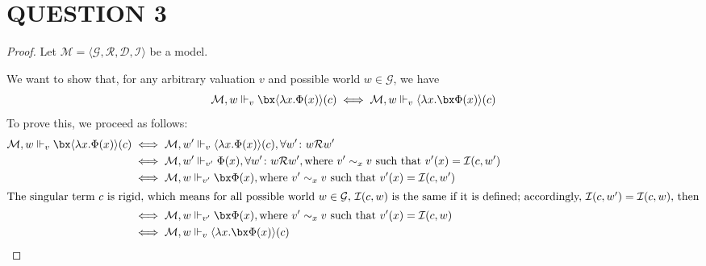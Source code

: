\section*{QUESTION 3}
\begin{proof}
Let $\mathcal{M} = \langle \mathcal{G}, \mathcal{R}, \mathcal{D}, \mathcal{I} \rangle$ be a model.

We want to show that, for any arbitrary valuation $v$ and possible world $w \in \mathcal{G}$, we have
\[
\mathcal{M}, w \Vdash_{v} \bx \langle \lambda x. \Phi(x) \rangle(c) \iff \mathcal{M}, w \Vdash_{v} \langle \lambda x. \bx \Phi(x) \rangle(c)
\]
To prove this, we proceed as follows:
\begin{align*}
\mathcal{M}, w \Vdash_{v} \bx \langle \lambda x. \Phi(x) \rangle(c)
&\iff \mathcal{M}, w' \Vdash_{v} \langle \lambda x. \Phi(x) \rangle(c), \forall w' \colon w\mathcal{R}w' \\
&\iff \mathcal{M}, w' \Vdash_{v'} \Phi(x), \forall w' \colon w\mathcal{R}w', \text{where $v' \sim_x v$ such that $v'(x) = \mathcal{I}(c, w')$} \\
&\iff \mathcal{M}, w \Vdash_{v'} \bx \Phi(x), \text{where $v' \sim_x v$ such that $v'(x) = \mathcal{I}(c, w')$} \\
\intertext{The singular term $c$ is rigid, which means for all possible world $w \in \mathcal{G}$, $\mathcal{I}(c, w)$ is the same if it is defined; accordingly, $\mathcal{I}(c, w') = \mathcal{I}(c, w)$, then}
&\iff \mathcal{M}, w \Vdash_{v'} \bx \Phi(x), \text{where $v' \sim_x v$ such that $v'(x) = \mathcal{I}(c, w)$} \\
&\iff \mathcal{M}, w \Vdash_{v} \langle \lambda x. \bx \Phi(x) \rangle(c)
\end{align*}
\end{proof}
